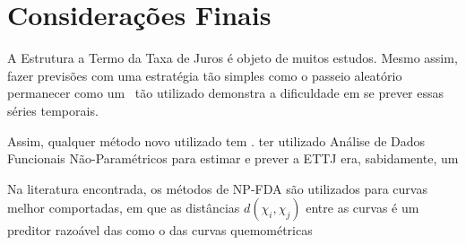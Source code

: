 \documentclass[
	12pt,				%
	openright,			%
	oneside,			%
	a4paper,			%
	english,			%
	brazil				%
	]{dissertacao-ufrgs-abntex2}
\begin{document}
%





\chapter*[Conclusão]{Considerações Finais} \label{ch:conclusao}

A Estrutura a Termo da Taxa de Juros é objeto de muitos estudos. Mesmo assim, fazer previsões com uma estratégia tão simples como o passeio aleatório permanecer como um \bm~tão utilizado demonstra a dificuldade em se prever essas séries temporais.

Assim, qualquer método novo utilizado tem . 
ter utilizado Análise de Dados Funcionais Não-Paramétricos para estimar e prever a ETTJ era, sabidamente, um

Na literatura encontrada, os métodos de NP-FDA são utilizados para curvas melhor comportadas, em que as distâncias $d(\chi_i,\chi_j)$ entre as curvas é um preditor razoável das  como o das curvas quemométricas



\end{document}
